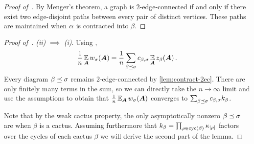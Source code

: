 \begin{proof}[Proof of~]
    By Menger's theorem, a graph is 2-edge-connected 
    if and only if there exist two edge-disjoint 
    paths between every pair of distinct vertices.
    These paths are maintained when $\alpha$ is contracted into $\beta$.
\end{proof}

\begin{proof}[Proof of~]
    {\em (ii)} $\implies$ {\em (i)}. Using ,
    \[
        \frac 1n \operatorname*{\mathbb{E}}_{{\bm A}} w_\sigma({\bm A}) = \frac 1n \sum_{\beta \preceq \sigma} c_{\beta, \sigma} \operatorname*{\mathbb{E}}_{{\bm A}} z_\beta({\bm A})\,.
    \]
    Every diagram $\beta \preceq \sigma$ remains 2-edge-connected by \cref{lem:contract-2ec}.
    There are only finitely many terms in the
    sum, so we can directly
    take the $n\to\infty$ limit
    and use the assumptions
    to obtain that $\frac 1n \operatorname*{\mathbb{E}}_{\bm A} w_\sigma({\bm A})$ converges to $\sum_{\beta \preceq \sigma} c_{\beta, \sigma} k_\beta$.

    Note that by the weak cactus property,
    the only asymptotically nonzero $\beta \preceq \sigma$ are when $\beta$ is a cactus.
    Assuming furthermore that $k_\beta = \prod_{\rho \in \mathrm{cyc}(\beta)} \kappa_{|\rho|}$ factors over the cycles of each cactus $\beta$ we will derive the second part of the lemma.


\end{proof}
